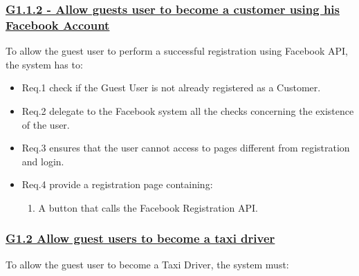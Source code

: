 \documentclass{report}
\begin{document}
			\subsubsection{\lbrack \hyperref[sec:g1_1_2]{G1.1.2 - Allow guests user to become a customer using his Facebook Account}\rbrack}
			To allow the guest user to perform a successful registration using Facebook API, the system has to:

				\begin{itemize}
					\item \lbrack Req.1\rbrack \label{sec:fr1_g1_1_2} check if the Guest User is not already registered as a Customer.
					\item \lbrack Req.2\rbrack \label{sec:fr2_g1_1_2} delegate to the Facebook system all the checks concerning the existence of the user.
					\item \lbrack Req.3\rbrack \label{sec:fr3_g1_1_2} ensures that the user cannot access to pages different from registration and login.
 					\item \lbrack Req.4\rbrack \label{sec:fr4_g1_1_2} provide a registration page containing:
						\begin{enumerate}
							\item A button that calls the Facebook Registration API.
						\end{enumerate}
				\end{itemize}

			\subsubsection{\lbrack \hyperref[sec:g1_2]{G1.2 Allow guest users to become a taxi driver}\rbrack}
			To allow the guest user to become a Taxi Driver, the system must:
\end{document}
